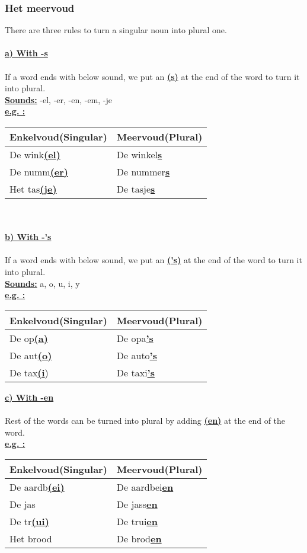 \documentclass[a4paper,14pt]{extarticle}
\newcommand{\emp}[1]{\underline{\textbf{#1}}}
\begin{document}
\subsubsection{Het meervoud}
There are three rules to turn a singular noun into plural one.\\ \\
\emp{a) With -s} \\ \\
If a word ends with below sound, we put an \emp{(s)} at the end of the word to turn it into plural. \\
\emp{Sounds:} -el, -er, -en, -em, -je \\
\emp{e.g. : } \\
\begin{tabularx}{\textwidth}{ p{} p{} }
 \hline
 Enkelvoud(Singular) & Meervoud(Plural)\\
 \hline
 De wink\emp{(el)} & De winkel\emp{s} \\
 De numm\emp{(er)} & De nummer\emp{s} \\
 Het tas\emp{(je)} & De tasje\emp{s}
\end{tabularx} \\  \\
\emp{b) With -'s} \\ \\
If a word ends with below sound, we put an \emp{('s)} at the end of the word to turn it into plural. \\
\emp{Sounds:} a, o, u, i, y \\
\emp{e.g. : } \\
\begin{tabularx}{\textwidth}{ p{} p{} }
 \hline
 Enkelvoud(Singular) & Meervoud(Plural)\\
 \hline
 De op\emp{(a)} & De opa\emp{'s} \\
 De aut\emp{(o)} & De auto\emp{'s} \\
 De tax\emp{(i}) & De taxi\emp{'s}
\end{tabularx}
\emp{c) With -en} \\ \\
Rest of the words can be turned into plural by adding \emp{(en)} at the end of the word. \\
\emp{e.g. : } \\
\begin{tabularx}{\textwidth}{ p{} p{} }
 \hline
 Enkelvoud(Singular) & Meervoud(Plural)\\
 \hline
 De aardb\emp{(ei)} & De aardbei\emp{en} \\
 De jas & De jass\emp{en} \\
 De tr\emp{(ui)} & De trui\emp{en} \\
 Het brood & De brod\emp{en}
\end{tabularx} \\ \\
\end{document}

